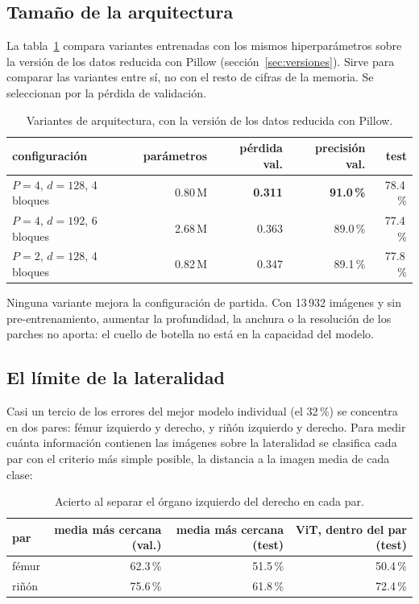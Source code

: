\documentclass[11pt,a4paper]{article}
\begin{document}
\subsection{Tamaño de la arquitectura}
\label{sec:arquitecturas}

La tabla~\ref{tab:arquitecturas} compara variantes entrenadas con los mismos
hiperparámetros sobre la versión de los datos reducida con Pillow
(sección~\ref{sec:versiones}). Sirve para comparar las variantes entre sí, no
con el resto de cifras de la memoria. Se seleccionan por la pérdida de
validación.

\begin{table}[H]
  \centering\small
  \begin{tabular}{lrrrr}
    \toprule
    configuración & parámetros & pérdida val. & precisión val. & test \\
    \midrule
    $P=4$, $d=128$, 4 bloques & 0.80\,M & \textbf{0.311} & \textbf{91.0\,\%} & 78.4\,\% \\
    $P=4$, $d=192$, 6 bloques & 2.68\,M & 0.363 & 89.0\,\% & 77.4\,\% \\
    $P=2$, $d=128$, 4 bloques & 0.82\,M & 0.347 & 89.1\,\% & 77.8\,\% \\
    \bottomrule
  \end{tabular}
  \caption{Variantes de arquitectura, con la versión de los datos reducida con
           Pillow.}
  \label{tab:arquitecturas}
\end{table}

Ninguna variante mejora la configuración de partida. Con 13\,932 imágenes y sin
pre-entrenamiento, aumentar la profundidad, la anchura o la resolución de los
parches no aporta: el cuello de botella no está en la capacidad del modelo.

\subsection{El límite de la lateralidad}

Casi un tercio de los errores del mejor modelo individual (el 32\,\%) se
concentra en dos pares: fémur izquierdo y derecho, y riñón izquierdo y derecho. Para medir cuánta
información contienen las imágenes sobre la lateralidad se clasifica cada par
con el criterio más simple posible, la distancia a la imagen media de cada
clase:

\begin{table}[H]
  \centering\small
  \begin{tabular}{lrrr}
    \toprule
    par & media más cercana (val.) & media más cercana (test) & ViT, dentro del par (test) \\
    \midrule
    fémur & 62.3\,\% & 51.5\,\% & 50.4\,\% \\
    riñón & 75.6\,\% & 61.8\,\% & 72.4\,\% \\
    \bottomrule
  \end{tabular}
  \caption{Acierto al separar el órgano izquierdo del derecho en cada par.}
  \label{tab:lateralidad}
\end{table}
\end{document}

